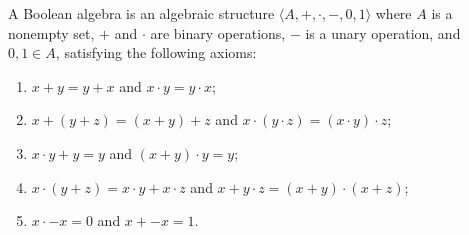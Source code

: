 A Boolean algebra is an algebraic structure $\langle A, +, \cdot, -, 0, 1 \rangle$ where $A$ is a nonempty set, $+$ and $\cdot$ are binary operations, $-$ is a unary operation, and $0, 1 \in A$, satisfying the following axioms:

\begin{enumerate}
\item[(i)] $x + y = y + x$ and $x \cdot y = y \cdot x$;
\item[(ii)] $x + (y + z) = (x + y) + z$ and $x \cdot (y \cdot z) = (x \cdot y) \cdot z$;
\item[(iii)] $x \cdot y + y = y$ and $(x + y) \cdot y = y$;
\item[(iv)] $x \cdot (y + z) = x \cdot y + x \cdot z$ and $x + y \cdot z = (x + y) \cdot (x + z)$;
\item[(v)] $x \cdot -x = 0$ and $x + -x = 1$.
\end{enumerate}
